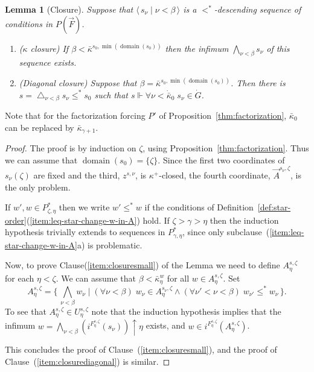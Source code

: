 \documentclass[
twoside,
]{article}
\newtheorem{lemma}[theorem]{Lemma}
\theoremstyle{definition}
\theoremstyle{remark}
\newcommand{\forceKappa}{\bar\kappa} %
\newcommand{\scutdown}{{\uparrow}}
\newcommand{\forces}{\Vdash}
\newcommand{\sing}[1]{\{#1\}}
\newcommand{\set}[1]{\{\,#1\,\}}
\newcommand{\pair}[1]{\langle#1\rangle}
\newcommand{\seq}[1]{\pair{\,#1\,}}
\DeclareMathOperator{\domain}{domain}
\begin{document}
\begin{lemma}[Closure]
  \label{thm:closure}
    Suppose that $\seq{s_{\nu}\mid\nu<\beta}$ is a
  $<^{*}$-descending sequence of conditions in $P(\vec F)$.  
  \begin{enumerate}
  \item\label{item:closuresmall}($\kappa$ closure)
    If $\beta<\forceKappa^{s_0,\min(\domain(s_0))}$ then the infimum
    $\bigwedge_{\nu<\beta}s_\nu$ of this sequence exists.
  \item (Diagonal closure)\label{item:closurediagonal}
    Suppose that  $\beta=\forceKappa^{s_0,\min(\domain(s_0))}$.
    Then there is $s=\bigtriangleup_{\nu<\beta}s_\nu\leq^* s_0$ such that 
    $s\forces\forall\nu<\dot\forceKappa_0\;s_{\nu}\in\dot G$.
    \end{enumerate}
\end{lemma}
Note that for the factorization forcing $P'$ of
Proposition~\ref{thm:factorization}, $\forceKappa_0$ can be replaced
by $\forceKappa_{\gamma+1}$.
\begin{proof}
   The proof is by
  induction on $\zeta$, using Proposition~\ref{thm:factorization}.
  Thus we can  assume that $\domain(s_0)=\sing{\zeta}$.
  Since the first two coordinates of $s_{\nu}(\zeta)$ are fixed and
  the third, $z^{s,\nu}$, is $\kappa^+$-closed, the fourth coordinate,
  $\vec A^{s_\nu,\zeta}$, is the only problem.   
  
  If $w',w\in P_{\zeta,\eta}^*$ then we write $w'\leq^* w$ if the
  conditions of
  Definition~\ref{def:star-order}(\ref{item:leq-star-change-w-in-A}) hold.
  If $\zeta>\gamma>\eta$ then the induction hypothesis trivially
  extends to  sequences
  in $P^*_{\gamma,\eta}$, since only subclause~(\ref{item:leq-star-change-w-in-A}a) is problematic.

  Now, to prove Clause(\ref{item:closuresmall}) of the Lemma we need to define
  $A^{s,\zeta}_{\eta}$ for each $\eta<\zeta$.  We can assume that
  $\beta<\forceKappa^{w}_{\eta}$ for all $w\in
  A^{s,\zeta}_{\eta}$.  Set
  \begin{equation*}
    A^{s,\zeta}_{\eta}=\set{\bigwedge_{\nu<\beta}w_{\nu}\mid
    (\forall\nu<\beta)\;w_\nu\in A^{s_\nu,\zeta}_{\eta}\land
    (\forall\nu'<\nu<\beta)\; w_{\nu'}\leq^*w_{\nu}}.
  \end{equation*}
  To see that  $A^{s,\zeta}_{\eta}\in U^{s,\zeta}_{\eta}$ note that
  the induction hypothesis implies that  
  the infimum
  $w=\bigwedge_{\nu<\beta}(i^{F^{s,\zeta}_\eta}(s_\nu))\scutdown\eta$
  exists,  and
  $w\in i^{F^{s,\zeta}_\eta}(A^{s,\zeta}_{\eta})$.  

  This concludes the proof of Clause~(\ref{item:closuresmall}), and
  the proof of Clause~(\ref{item:closurediagonal}) is similar. 
\end{proof}
\end{document}
